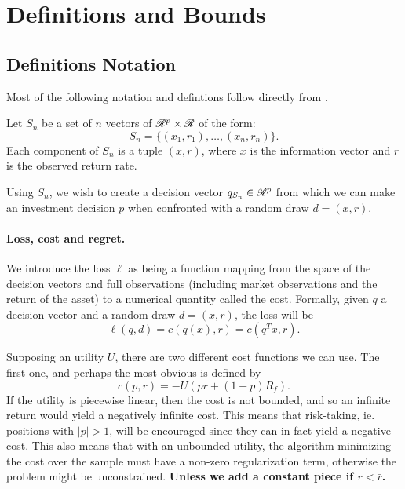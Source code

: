 \section{Definitions and Bounds}

\subsection{Definitions Notation}

Most of the following notation and defintions follow directly from \cite{bousquet2002}.

Let $S_n$ be a set of $n$ vectors of $\mathscr{R}^p\times\mathscr{R}$ of the form:
\begin{equation}
  S_n = \{(x_1,r_1),\ldots,(x_n,r_n)\}.
\end{equation}
Each component of $S_n$ is a tuple $(x,r)$, where $x$ is the information vector and $r$ is
the observed return rate.

Using $S_n$, we wish to create a decision vector $q_{S_n}\in\mathscr{R}^p$ from which we can
make an investment decision $p$  when confronted with a random draw $d=(x,r)$.

\paragraph{Loss, cost and regret.}
We introduce the loss $\ell$ as being a function mapping from the space of the decision
vectors and full observations (including market observations and the return of the asset)
to a numerical quantity called the cost. Formally, given $q$ a decision vector and a
random draw $d=(x,r)$, the loss will be
\begin{equation}
\ell(q,d) = c(q(x),r) = c(q^Tx,r).
\end{equation}

Supposing an utility $U$, there are two different cost functions we can use. The first
one, and perhaps the most obvious is defined by
\begin{equation}
  c(p,r) = -U(pr + (1-p)R_f).
\end{equation}
If the utility is piecewise linear, then the cost is not bounded, and so an infinite
return would yield a negatively infinite cost. This means that risk-taking, ie. positions
with $|p|>1$, will be encouraged since they can in fact yield a negative cost. This also
means that with an unbounded utility, the algorithm minimizing the cost over the sample
must have a non-zero regularization term, otherwise the problem might be
unconstrained. \textbf{Unless we add a constant piece if $r<\bar r$.}

